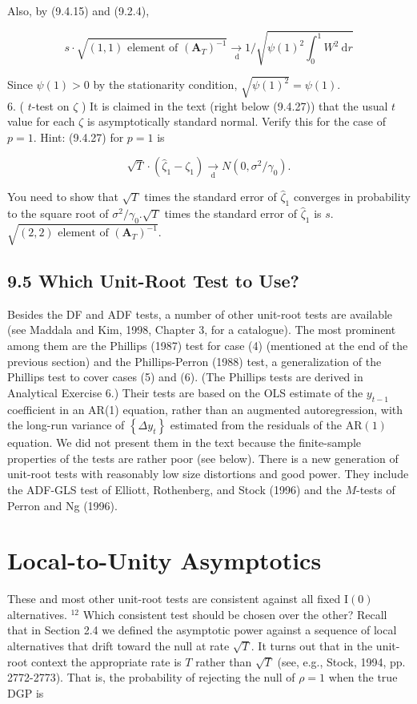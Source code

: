 \documentclass[10pt]{article}
\begin{document}
Also, by (9.4.15) and (9.2.4),


\begin{equation*}
s \cdot \sqrt{(1,1) \text { element of }\left(\mathbf{A}_{T}\right)^{-1}} \underset{\mathrm{~d}}{\rightarrow} 1 / \sqrt{\psi(1)^{2} \int_{0}^{1} W^{2} \mathrm{~d} r} \tag{9.4.41}
\end{equation*}


Since $\psi(1)>0$ by the stationarity condition, $\sqrt{\psi(1)^{2}}=\psi(1)$.\\
6. ( $t$-test on $\zeta$ ) It is claimed in the text (right below (9.4.27)) that the usual $t$ value for each $\zeta$ is asymptotically standard normal. Verify this for the case of $p=1$. Hint: (9.4.27) for $p=1$ is

$$
\sqrt{T} \cdot\left(\hat{\zeta}_{1}-\zeta_{1}\right) \underset{\mathrm{d}}{\rightarrow} N\left(0, \sigma^{2} / \gamma_{0}\right) .
$$

You need to show that $\sqrt{T}$ times the standard error of $\hat{\zeta}_{1}$ converges in probability to the square root of $\sigma^{2} / \gamma_{0} . \sqrt{T}$ times the standard error of $\hat{\zeta}_{1}$ is $s$. $\sqrt{(2,2) \text { element of }\left(\mathbf{A}_{T}\right)^{-1}}$.

\subsection*{9.5 Which Unit-Root Test to Use?}
Besides the DF and ADF tests, a number of other unit-root tests are available (see Maddala and Kim, 1998, Chapter 3, for a catalogue). The most prominent among them are the Phillips (1987) test for case (4) (mentioned at the end of the previous section) and the Phillips-Perron (1988) test, a generalization of the Phillips test to cover cases (5) and (6). (The Phillips tests are derived in Analytical Exercise 6.) Their tests are based on the OLS estimate of the $y_{t-1}$ coefficient in an AR(1) equation, rather than an augmented autoregression, with the long-run variance of $\left\{\Delta y_{t}\right\}$ estimated from the residuals of the $\mathrm{AR}(1)$ equation. We did not present them in the text because the finite-sample properties of the tests are rather poor (see below). There is a new generation of unit-root tests with reasonably low size distortions and good power. They include the ADF-GLS test of Elliott, Rothenberg, and Stock (1996) and the $M$-tests of Perron and Ng (1996).

\section*{Local-to-Unity Asymptotics}
These and most other unit-root tests are consistent against all fixed $\mathrm{I}(0)$ alternatives. ${ }^{12}$ Which consistent test should be chosen over the other? Recall that in Section 2.4 we defined the asymptotic power against a sequence of local alternatives that drift toward the null at rate $\sqrt{T}$. It turns out that in the unit-root context the appropriate rate is $T$ rather than $\sqrt{T}$ (see, e.g., Stock, 1994, pp. 2772-2773). That is, the probability of rejecting the null of $\rho=1$ when the true DGP is
\end{document}
